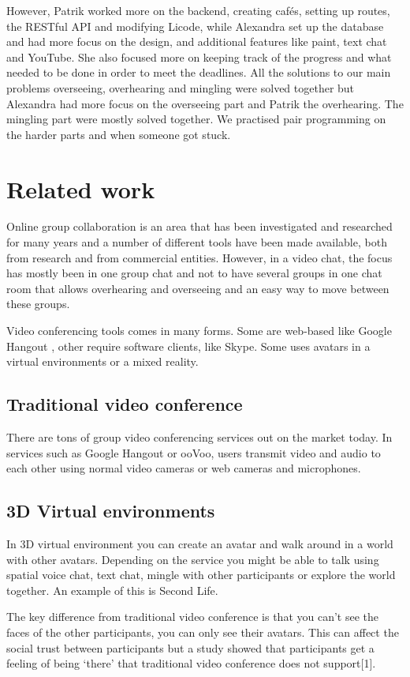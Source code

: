\documentclass[12pt, titlepage]{article}
\begin{document}
However, Patrik worked more on the backend, creating cafés, setting up routes, the RESTful API and modifying Licode, while Alexandra set up the database and had more focus on the design, and additional features like paint, text chat and YouTube. She also focused more on keeping track of the progress and what needed to be done in order to meet the deadlines. All the solutions to our main problems overseeing, overhearing and mingling were solved together but Alexandra had more focus on the overseeing part and Patrik the overhearing. The mingling part were mostly solved together. We practised pair programming on the harder parts and when someone got stuck.
\section{Related work}
Online group collaboration is an area that has been investigated and researched for many years and a number of different tools have been made available, both from research and from commercial entities. However, in a video chat, the focus has mostly been in one group chat and not to have several groups in one chat room that allows overhearing and overseeing and an easy way to move between these groups.

Video conferencing tools comes in many forms. Some are web-based like Google Hangout \cite{6}, other require software clients, like Skype\cite{10}. Some uses avatars in a virtual environments or a mixed reality.
\subsection{Traditional video conference}
There are tons of group video conferencing services out on the market today. In services such as Google Hangout\cite{6} or ooVoo\cite{7}, users transmit video and audio to each other using normal video cameras or web cameras and microphones.
\subsection{3D Virtual environments}
In 3D virtual environment you can create an avatar and walk around in a world with other avatars. Depending on the service you might be able to talk using spatial voice chat, text chat, mingle with other participants or explore the world together. An example of this is Second Life\cite{3}.

The key difference from traditional video conference is that you can’t see the faces of the other participants, you can only see their avatars. This can affect the social trust between participants but a study showed that participants get a feeling of being ‘there’ that traditional video conference does not support[1].
\end{document}
